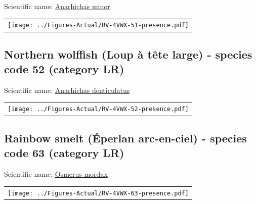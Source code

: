 \documentclass[12pt]{article}\usepackage[]{graphicx}\usepackage[]{color}
\begin{document}
Scientific name: \href{http://www.marinespecies.org/aphia.php?p=taxdetails\&id=126759}{Anarhichas minor} \newline
\begin{minipage}{1.0\textwidth}
 \begin{tabular}{c}
\texttt{[image: ../Figures-Actual/RV-4VWX-51-presence.pdf]} \\ 
\end{tabular} 
\end{minipage}
\clearpage

\renewcommand\thefigure{\thesubsection\Alph{figure}}

\setcounter{figure}{0}

\hypertarget{sec:52}{%
\subsection{Northern wolffish (Loup à tête large) - species code 52 (category LR)}\label{sec:52}}

  


Scientific name: \href{http://www.marinespecies.org/aphia.php?p=taxdetails\&id=126757}{Anarhichas denticulatus} \newline
\begin{minipage}{1.0\textwidth}
 \begin{tabular}{c}
\texttt{[image: ../Figures-Actual/RV-4VWX-52-presence.pdf]} \\ 
\end{tabular} 
\end{minipage}
\clearpage

\renewcommand\thefigure{\thesubsection\Alph{figure}}

\setcounter{figure}{0}

\hypertarget{sec:63}{%
\subsection{Rainbow smelt (Éperlan arc-en-ciel) - species code 63 (category LR)}\label{sec:63}}

  


Scientific name: \href{http://www.marinespecies.org/aphia.php?p=taxdetails\&id=126737}{Osmerus mordax} \newline
\begin{minipage}{1.0\textwidth}
 \begin{tabular}{c}
\texttt{[image: ../Figures-Actual/RV-4VWX-63-presence.pdf]} \\ 
\end{tabular} 
\end{minipage}
\clearpage
\end{document}
